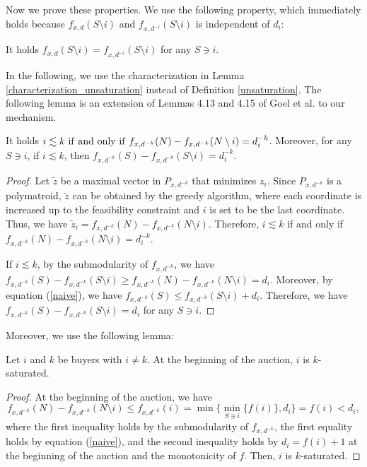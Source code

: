 \documentclass[letterpaper,11pt]{article}
\begin{document}
Now we prove these properties. 
We use the following property, which immediately holds because $f_{x,d}(S\setminus i)$ 
and $f_{x,d^{-i}}(S\setminus i)$ is independent of $d_i$:
\begin{observation}
\label{fact}
It holds $f_{x,d}(S\setminus i)=f_{x,d^{-i}}(S\setminus i)$ for any $S\ni i$.
\end{observation}

In the following, we use the characterization in Lemma \ref{characterization_unsaturation} 
instead of Definition \ref{unsaturation}.
The following lemma is an extension of Lemmas 4.13 and 4.15 
of Goel et al. \cite{GMP2014} to our mechanism.

\begin{lemma}
\label{characterization_unsaturation}
It holds 
$i\lesssim k\  {\rm if\ and\ only\ if}\  f_{x,d^{-k}}(N)-f_{x,d^{-k}}(N\setminus i)=d^{-k}_i$.
Moreover, for any $S\ni i$,  if $i\lesssim k$, then $f_{x,d^{-k}}(S)-f_{x,d^{-k}}(S\setminus i)=d^{-k}_i$.
\end{lemma}
\begin{proof}
Let $\tilde{z}$ be a maximal vector in  $P_{x,d^{-k}}$ that minimizes $z_i$.
Since $P_{x,d^{-k}}$ is a polymatroid, $\tilde{z}$ can be obtained by the greedy algorithm,
where each coordinate is increased up to the feasibility constraint 
and $i$ is set to be the last coordinate.
Thus, we have $\tilde{z}_i=f_{x,d^{-k}}(N)-f_{x,d^{-k}}(N\setminus i)$.
Therefore, $i\lesssim k$ if and only if $f_{x,d^{-k}}(N)-f_{x,d^{-k}}(N\setminus i)=d^{-k}_i$.

If $i\lesssim k$, by the submodularity of $f_{x,d^{-k}}$, 
we have $f_{x,d^{-k}}(S)-f_{x,d^{-k}}(S\setminus i)\geq f_{x,d^{-k}}(N)-f_{x,d^{-k}}(N\setminus i)=d_i$.
Moreover, by equation (\ref{naive}), we have $f_{x,d^{-k}}(S)\leq f_{x,d^{-k}}(S\setminus i)+d_i$.
Therefore, we have $f_{x,d^{-k}}(S)-f_{x,d^{-k}}(S\setminus i)= d_i$ for any $S\ni i$.
\end{proof}

Moreover, we use the following lemma: 

\begin{lemma}
\label{beginning_saturation}
Let $i$ and $k$ be buyers with $i\neq k$.
At the beginning of the auction, $i$ is $k$-saturated.
\end{lemma}
	\begin{proof}
	At the beginning of the auction, 
	we have 
	\[
	f_{x,d^{-k}}(N)-f_{x,d^{-k}}(N\setminus i)\leq f_{x,d^{-k}}(i)=\min\{\min_{S\ni i}\{f(i)\}, d_i\}=f(i)<d_i,
	\]
	where the first inequality holds by the submodularity of $f_{x,d^{-k}}$, 
	the first equality holds by equation (\ref{naive}), 
	and the second inequality holds by $d_i=f(i)+1$ at the beginning of the auction and the monotonicity of $f$.
	Then, $i$ is $k$-saturated.
	\end{proof}
\end{document}
